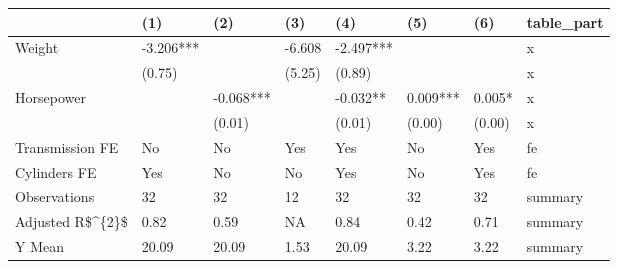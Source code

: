 \captionsetup[table]{labelformat=empty,skip=1pt}
\begin{longtable}{llllllll}
\toprule
  & (1) & (2) & (3) & (4) & (5) & (6) & table\_part \\ 
\midrule
Weight & -3.206*** &  & -6.608 & -2.497*** &  &  & x \\ 
 & (0.75) &  & (5.25) & (0.89) &  &  & x \\ 
Horsepower &  & -0.068*** &  & -0.032** & 0.009*** & 0.005* & x \\ 
 &  & (0.01) &  & (0.01) & (0.00) & (0.00) & x \\ 
Transmission FE & No & No & Yes & Yes & No & Yes & fe \\ 
Cylinders FE & Yes & No & No & Yes & No & Yes & fe \\ 
Observations & 32 & 32 & 12 & 32 & 32 & 32 & summary \\ 
Adjusted R\$\textasciicircum \{2\}\$ & 0.82 & 0.59 & NA & 0.84 & 0.42 & 0.71 & summary \\ 
Y Mean & 20.09 & 20.09 & 1.53 & 20.09 & 3.22 & 3.22 & summary \\ 
\bottomrule
\end{longtable}

